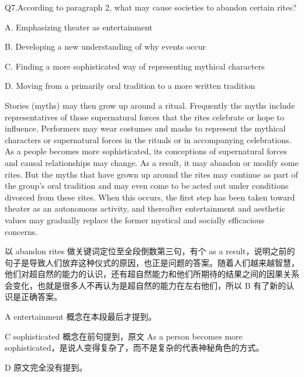 \begin{blk}
  \begin{qst}
    Q7.According to paragraph 2, what may cause societies to abandon certain rites?
  \end{qst}

  \begin{chc}
    A. Emphasizing theater as entertainment

    B. Developing a new understanding of why events occur

    C. Finding a more sophisticated way of representing mythical characters

    D. Moving from a primarily oral tradition to a more written tradition
  \end{chc}

  \begin{psgq}
    Stories (myths) may then grow up around a ritual. Frequently the myths include representatives of those supernatural forces that the rites celebrate or hope to influence. Performers may wear costumes and masks to represent the mythical characters or supernatural forces in the rituals or in accompanying celebrations. As a people becomes more sophisticated, its conceptions of supernatural forces and causal relationships may change. As a result, it may abandon or modify some rites. But the myths that have grown up around the rites may continue as part of the group’s oral tradition and may even come to be acted out under conditions divorced from these rites. When this occurs, the first step has been taken toward theater as an autonomous activity, and thereafter entertainment and aesthetic values may gradually replace the former mystical and socially efficacious concerns.
  \end{psgq}

  \begin{nlz}
    以 abandon rites 做关键词定位至全段倒数第三句，有个 as a result，说明之前的句子是导致人们放弃这种仪式的原因，也正是问题的答案。随着人们越来越智慧，他们对超自然的能力的认识，还有超自然能力和他们所期待的结果之间的因果关系会变化，也就是很多人不再认为是超自然的能力在左右他们，所以 B 有了新的认识是正确答案。

    A entertainment 概念在本段最后才提到。

    C sophisticated 概念在前句提到，原文 As a person becomes more sophisticated，是说人变得复杂了，而不是复杂的代表神秘角色的方式。

    D 原文完全没有提到。
  \end{nlz}
\end{blk}

